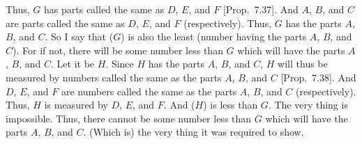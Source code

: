 \begin{Parallel}{}{}
{Thus, $G$ has parts called the same as $D$, $E$, and $F$ [Prop.~7.37]. And $A$, $B$, and $C$ are 
parts called the same as $D$, $E$, and $F$ (respectively). Thus, $G$ has the parts $A$, $B$, and $C$. So I say that ($G$) is also the least (number having the parts $A$, $B$, and $C$). For if not, there will be some number less than $G$ which will have the parts $A$, $B$, and $C$. Let it be
$H$. Since $H$ has the parts $A$, $B$, and $C$, $H$ will thus be measured
by numbers called the same as the parts $A$, $B$, and $C$  [Prop.~7.38]. And $D$, $E$, and $F$ are numbers called the same as the parts $A$, $B$, and $C$ (respectively). Thus, $H$ is measured by $D$, $E$, and $F$. And ($H$) is less than $G$. The
very thing is impossible. Thus, there cannot be some number less than $G$
which will have the parts $A$, $B$, and $C$. (Which is) the very thing it
was required to show.}
\end{Parallel}

\newpage
\thispagestyle{empty}
~\\